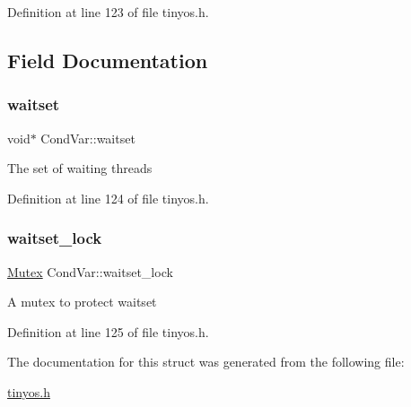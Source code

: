 Definition at line 123 of file tinyos.\+h.



\subsection{Field Documentation}
\mbox{\label{structCondVar_a7da9e0169713c3b3ae386a8ab49f7e34}} 
\subsubsection{\texorpdfstring{waitset}{waitset}}
{\footnotesize\ttfamily void$\ast$ Cond\+Var\+::waitset}

The set of waiting threads 

Definition at line 124 of file tinyos.\+h.

\mbox{\label{structCondVar_a477b855f4d3880d231206ae79bd5b6cf}} 
\subsubsection{\texorpdfstring{waitset\+\_\+lock}{waitset\_lock}}
{\footnotesize\ttfamily \hyperlink{group__syscalls_gaef2ec62cae8e0031fd19fc8b91083ade}{Mutex} Cond\+Var\+::waitset\+\_\+lock}

A mutex to protect {\ttfamily waitset} 

Definition at line 125 of file tinyos.\+h.



The documentation for this struct was generated from the following file\+:\begin{DoxyCompactItemize}
\item 
\hyperlink{tinyos_8h}{tinyos.\+h}\end{DoxyCompactItemize}
